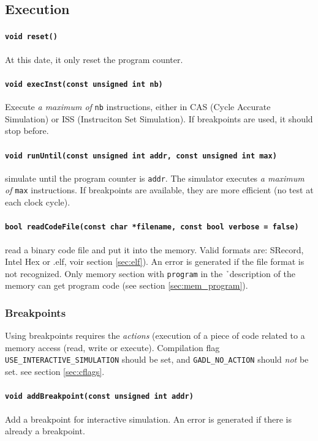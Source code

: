 \subsection{Execution}
\paragraph{\texttt{void reset()}}
At this date, it only reset the program counter.

\paragraph{\texttt{void execInst(const unsigned int nb)}} Execute \emph{a maximum of} \texttt{nb} instructions, either in CAS (Cycle Accurate Simulation) or ISS (Instruciton Set Simulation). If breakpoints are used, it should stop before.

\paragraph{\texttt{void runUntil(const unsigned int addr, const unsigned int max)}} simulate until the program counter is  \texttt{addr}. The simulator executes \emph{a maximum of} \texttt{max} instructions. If breakpoints are available, they are more efficient (no test at each clock cycle).

\paragraph{\texttt{bool readCodeFile(const char *filename, const bool verbose = false)}} read a binary code file and put it into the memory. Valid formats are: SRecord, Intel Hex or .elf, voir section \ref{sec:elf}). An error is generated if the file format is not recognized. Only memory section with \texttt{program} in the \h\ description of the memory can get program code (see section \ref{sec:mem_program}).

\subsubsection{Breakpoints}
Using breakpoints requires the \emph{actions} (execution of a piece of code related to a memory access (read, write or execute). Compilation flag \texttt{USE\_INTERACTIVE\_SIMULATION} should be set, and \texttt{GADL\_NO\_ACTION} should \emph{not} be set. see section \ref{sec:cflags}.
\paragraph{\texttt{void addBreakpoint(const unsigned int addr)}} Add a breakpoint for interactive simulation. An error is generated if there is already a breakpoint.
